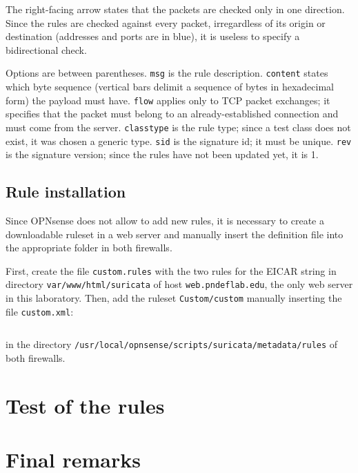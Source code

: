 \documentclass[draft]{homework}
\newcommand{\opn}{OPNsense\xspace}
\begin{document}
    The right-facing arrow states that the packets are checked only in one direction.
    Since the rules are checked against every packet, irregardless of its origin or destination (addresses and ports are in blue), it is useless to specify a bidirectional check.
    
    Options are between parentheses.
    \texttt{msg} is the rule description.
    \texttt{content} states which byte sequence (vertical bars delimit a sequence of bytes in hexadecimal form) the payload must have.
    \texttt{flow} applies only to TCP packet exchanges; it specifies that the packet must belong to an already-established connection and must come from the server.
    \texttt{classtype} is the rule type; since a test class does not exist, it was chosen a generic type.
    \texttt{sid} is the signature id; it must be unique.
    \texttt{rev} is the signature version; since the rules have not been updated yet, it is 1.
    
    \subsection{Rule installation}
    Since \opn does not allow to add new rules, it is necessary to create a downloadable ruleset in a web server and manually insert the definition file into the appropriate folder in both firewalls.
    
    First, create the file \texttt{custom.rules} with the two rules for the EICAR string in directory \texttt{var/www/html/suricata} of host \texttt{web.pndeflab.edu}, the only web server in this laboratory.
    Then, add the ruleset \texttt{Custom/custom} manually inserting the file \texttt{custom.xml}:
    \inputminted{xml}{files/custom.xml}
    \noindent in the directory \texttt{/usr/local/opnsense/scripts/suricata/metadata/rules} of both firewalls.
    
    
    \section{Test of the rules}
    
    
    \section{Final remarks}
\end{document}
